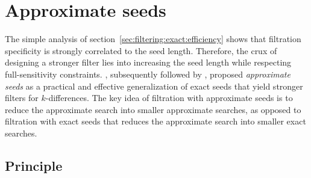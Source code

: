 

\section{Approximate seeds}
\label{sec:seeds-apx}

The simple analysis of section~\ref{sec:filtering:exact:efficiency} shows that filtration specificity is strongly correlated to the seed length.
Therefore, the crux of designing a stronger filter lies into increasing the seed length while respecting full-sensitivity constraints.
\cite{Myers1994}, subsequently followed by \cite{Navarro2000}, proposed \emph{approximate seeds} as a practical and effective generalization of exact seeds that yield stronger filters for $k$-differences.
The key idea of filtration with approximate seeds is to reduce the approximate search into smaller approximate searches, as opposed to filtration with exact seeds that reduces the approximate search into smaller exact searches.

\subsection{Principle}


